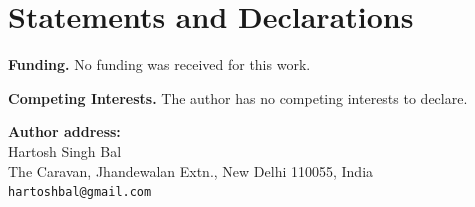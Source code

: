 \documentclass[11pt]{article}
\theoremstyle{plain}
\begin{document}
\section*{Statements and Declarations}
\textbf{Funding.} No funding was received for this work.

\textbf{Competing Interests.} The author has no competing interests to declare.



\vspace{2em}
\noindent\textbf{Author address:} \\
Hartosh Singh Bal \\
The Caravan, Jhandewalan Extn., New Delhi 110055, India \\
\texttt{hartoshbal@gmail.com}
\end{document}
